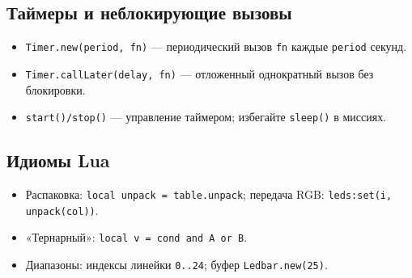 \subsection{Таймеры и неблокирующие вызовы}
\begin{itemize}
  \item \texttt{Timer.new(period, fn)} — периодический вызов \texttt{fn} каждые \texttt{period} секунд.
  \item \texttt{Timer.callLater(delay, fn)} — отложенный однократный вызов без блокировки.
  \item \texttt{start()/stop()} — управление таймером; избегайте \texttt{sleep()} в миссиях.
\end{itemize}

\subsection{Идиомы Lua}
\begin{itemize}
\item Распаковка: \texttt{local unpack = table.unpack}; передача RGB: \texttt{leds:set(i, unpack(col))}.
\item «Тернарный»: \texttt{local v = cond and A or B}.
\item Диапазоны: индексы линейки \texttt{0..24}; буфер \texttt{Ledbar.new(25)}.
\end{itemize}
